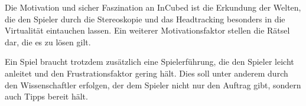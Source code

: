 
Die Motivation und sicher Faszination an InCubed ist die Erkundung der Welten, die den Spieler durch die Stereoskopie und das Headtracking besonders in die Virtualität eintauchen lassen. Ein weiterer Motivationsfaktor stellen die Rätsel dar, die es zu lösen gilt. 

Ein Spiel braucht trotzdem zusätzlich eine Spielerführung, die den Spieler leicht anleitet und den Frustrationsfaktor gering hält. Dies soll unter anderem durch den Wissenschaftler erfolgen, der dem Spieler nicht nur den Auftrag gibt, sondern auch Tipps bereit hält.